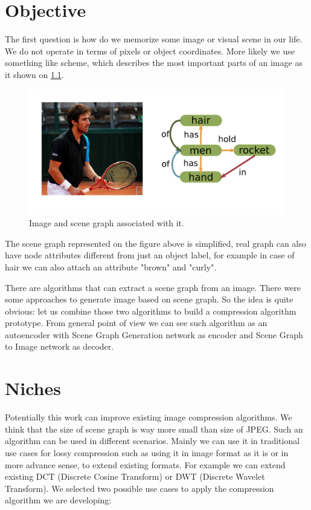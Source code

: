 \chapter{Objective}

The first question is how do we memorize some image or visual scene in our life. We do not operate in terms of pixels or object coordinates. More likely we use something like scheme, which describes the most important parts of an image as it shown on \ref{image_and_scene_graph}.

\begin{figure}[!h]
    \centering
    \includegraphics[width=\textwidth]{figure/image-and-scene-graph.png}
    \caption{Image and scene graph associated with it.}
    \label{image_and_scene_graph}
\end{figure}

The scene graph represented on the figure above is simplified, real graph can also have node attributes different from just an object label, for example in case of hair we can also attach an attribute "brown" and "curly".

There are algorithms that can extract a scene graph from an image. There were some approaches to generate image based on scene graph. So the idea is quite obvious: let us combine those two algorithms to build a compression algorithm prototype. From general point of view we can see such algorithm as an autoencoder with Scene Graph Generation network as encoder and Scene Graph to Image network as decoder.

\chapter{Niches}

Potentially this work can improve existing image compression algorithms. We think that the size of scene graph is way more small than size of JPEG. Such an algorithm can be used in different scenarios. Mainly we can use it in traditional use cases for lossy compression such as using it in image format as it is or in more advance sense, to extend existing formats. For example we can extend existing DCT (Discrete Cosine Transform) or DWT (Discrete Wavelet Transform). We selected two possible use cases to apply the compression algorithm we are developing:

